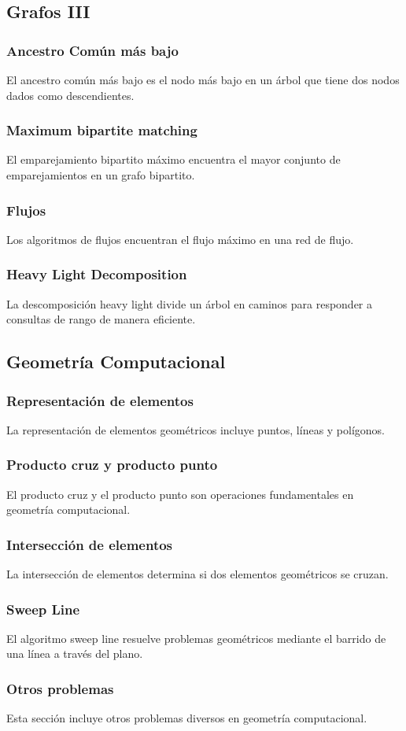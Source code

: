 \subsection{Grafos III}
\subsubsection{Ancestro Común más bajo}
El ancestro común más bajo es el nodo más bajo en un árbol que tiene dos nodos dados como descendientes.
\subsubsection{Maximum bipartite matching}
El emparejamiento bipartito máximo encuentra el mayor conjunto de emparejamientos en un grafo bipartito.
\subsubsection{Flujos}
Los algoritmos de flujos encuentran el flujo máximo en una red de flujo.
\subsubsection{Heavy Light Decomposition}
La descomposición heavy light divide un árbol en caminos para responder a consultas de rango de manera eficiente.

\subsection{Geometría Computacional}
\subsubsection{Representación de elementos}
La representación de elementos geométricos incluye puntos, líneas y polígonos.
\subsubsection{Producto cruz y producto punto}
El producto cruz y el producto punto son operaciones fundamentales en geometría computacional.
\subsubsection{Intersección de elementos}
La intersección de elementos determina si dos elementos geométricos se cruzan.
\subsubsection{Sweep Line}
El algoritmo sweep line resuelve problemas geométricos mediante el barrido de una línea a través del plano.
\subsubsection{Otros problemas}
Esta sección incluye otros problemas diversos en geometría computacional.
